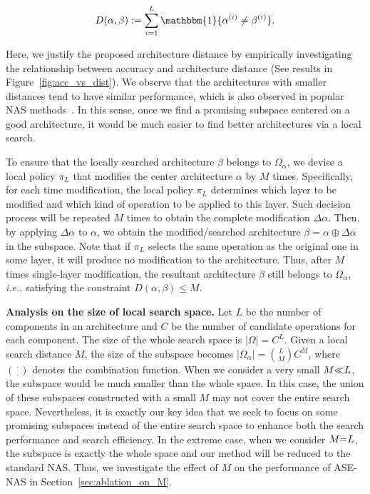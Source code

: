 \documentclass[lettersize,journal]{IEEEtran}
\newcommand{\sexyname}{ASE-NAS\xspace}
\def\ie{\emph{i.e.}} \def\Ie{\emph{I.e.}}
\begin{document}
\begin{align}\label{eq:architecture_distance}
    D(\alpha,\beta) := \sum_{i=1}^{L} \mathbbm{1}\{\alpha^{(i)} \neq \beta^{(i)}\}.
\end{align}

Here, we justify the proposed architecture distance by empirically investigating the relationship between accuracy and architecture distance (See results in Figure~\ref{fig:acc_vs_dist}).
We observe that the architectures with smaller distances tend to have similar performance, which is also observed in popular NAS methods~\cite{ying2019bench,guo2020breaking}. 
In this sense, once we find a promising subspace centered on a good architecture, it would be much easier to find better architectures via a local search.

To ensure that the locally searched architecture $\beta$ belongs to $\Omega_{\alpha}$, 
we devise a local policy $\pi_L$ that modifies the center architecture $\alpha$ by $M$ times. Specifically, for each time modification, the local policy $\pi_L$ determines which layer to be modified and which kind of operation to be applied to this layer. 
Such decision process will be repeated $M$ times to obtain the complete modification $\Delta\alpha$. Then, by applying $\Delta\alpha$ to $\alpha$, we obtain the modified/searched architecture $\beta=\alpha\oplus\Delta\alpha$ in the subspace. Note that if $\pi_L$ selects the same operation as the original one in some layer, it will produce no modification to the architecture. Thus, after $M$ times single-layer modification, the resultant architecture $\beta$ still belongs to $\Omega_{\alpha}$, \ie, satisfying the constraint $D(\alpha, \beta) \leq M$.

\textbf{Analysis on the size of local search space.}
Let $L$ be the number of components in an architecture and $C$ be the number of candidate operations for each component.
The size of the whole search space is $|\Omega|=C^L$.
Given a local search distance $M$, the size of the subspace becomes $|\Omega_{\alpha}| {=} \binom{L}{M} C^M$, where $\binom{\cdot}{\cdot}$ denotes the combination function. 
When we consider a very small $M \small{\ll} L$, the subspace would be much smaller than the whole space. In this case, the union of these subspaces constructed with a small $M$ may not cover the entire search space.
Nevertheless, it is exactly our key idea that we seek to focus on some promising subspaces instead of the entire search space to enhance both the search performance and search efficiency.
In the extreme case, when we consider $M\small{=}L$, the subspace is exactly the whole space and our method will be reduced to the standard NAS.
Thus, we investigate the effect of $M$ on the performance of \sexyname in Section~\ref{sec:ablation_on_M}.
\end{document}
